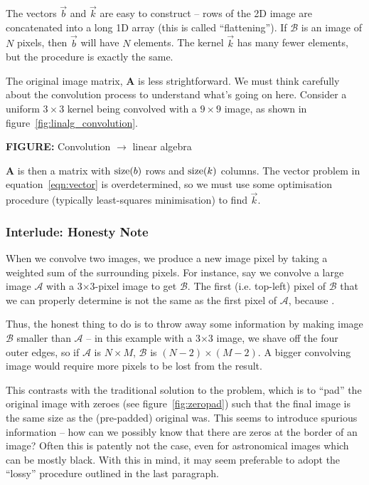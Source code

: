 \documentclass[letterpaper, 11pt]{article}
\def\ra{\ensuremath{\rightarrow}\xspace}
\def\MORE{{\color{red}{\bf MORE}}\xspace}
\def\FIG#1{{\bf FIGURE: }{#1}}
\begin{document}
The vectors $\vec b$ and $\vec k$ are easy to construct -- rows of the 2D image are concatenated into a long 1D array (this is called ``flattening''). If $\mathcal B$ is an image of $N$ pixels, then $\vec b$ will have $N$ elements. The kernel $\vec k$ has many fewer elements, but the procedure is exactly the same.

The original image matrix, $\mathbf A$ is less strightforward. We must think carefully about the convolution process to understand what's going on here. Consider a uniform $3\!\times\!3$ kernel being convolved with a $9\!\times\!9$ image, as shown in figure~\ref{fig:linalg_convolution}.

\FIG{Convolution \ra linear algebra}\label{fig:linalg_convolution}

\MORE

$\mathbf A$ is then a matrix with ${\rm size}(b)$ rows and ${\rm size}(k)$ columns. The vector problem in equation~\ref{eqn:vector} is overdetermined, so we must use some optimisation procedure (typically least-squares minimisation) to find $\vec k$.


\subsubsection{Interlude: Honesty Note}
\label{sec:shave}

When we convolve two images, we produce a new image pixel by taking a weighted sum of the surrounding pixels. For instance, say we convolve a large image $\mathcal{A}$ with a 3$\times$3-pixel image to get $\mathcal{B}$. The first (i.e. top-left) pixel of $\mathcal{B}$ that we can properly determine is not the same as the first pixel of $\mathcal{A}$, because \MORE.

Thus, the honest thing to do is to throw away some information by making image $\mathcal B$ smaller than $\mathcal A$ -- in this example with a 3$\times$3 image, we shave off the four outer edges, so if $\mathcal A$ is $N\times M$, $\mathcal B$ is $(N-2)\times(M-2)$. A bigger convolving image would require more pixels to be lost from the result.

This contrasts with the traditional solution to the problem, which is to ``pad'' the original image with zeroes (see figure~\ref{fig:zeropad}) such that the final image is the same size as the (pre-padded) original was. This seems to introduce spurious information -- how can we possibly know that there are zeros at the border of an image? Often this is patently not the case, even for astronomical images which can be mostly black. With this in mind, it may seem preferable to adopt the ``lossy'' procedure outlined in the last paragraph.
\end{document}
